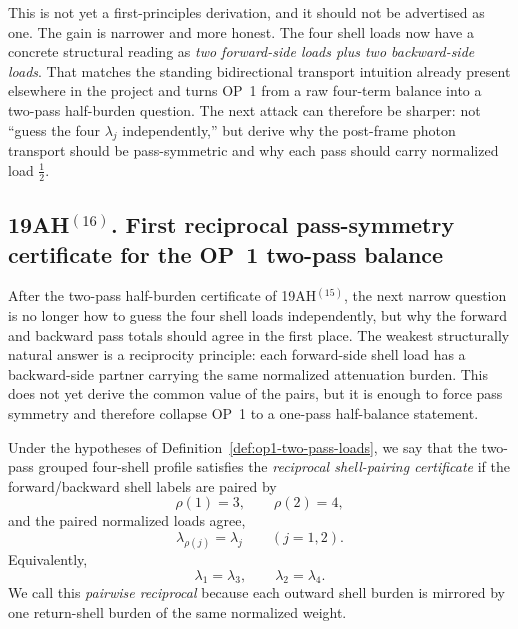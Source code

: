 \begin{remark}
This is not yet a first-principles derivation, and it should not be advertised as one. The gain is narrower and more honest. The four shell loads now have a concrete structural reading as \emph{two forward-side loads plus two backward-side loads}. That matches the standing bidirectional transport intuition already present elsewhere in the project and turns OP~1 from a raw four-term balance into a two-pass half-burden question. The next attack can therefore be sharper: not ``guess the four \(\lambda_j\) independently,'' but derive why the post-frame photon transport should be pass-symmetric and why each pass should carry normalized load \(\tfrac12\).
\end{remark}


\subsection*{19AH$^{(16)}$. First reciprocal pass-symmetry certificate for the OP~1 two-pass balance}
After the two-pass half-burden certificate of 19AH$^{(15)}$, the next narrow question is no longer how to guess the four shell loads independently, but why the forward and backward pass totals should agree in the first place. The weakest structurally natural answer is a reciprocity principle: each forward-side shell load has a backward-side partner carrying the same normalized attenuation burden. This does not yet derive the common value of the pairs, but it is enough to force pass symmetry and therefore collapse OP~1 to a one-pass half-balance statement.

\begin{definition}
\label{def:op1-reciprocal-shell-pairing}
Under the hypotheses of Definition~\ref{def:op1-two-pass-loads}, we say that the two-pass grouped four-shell profile satisfies the \emph{reciprocal shell-pairing certificate} if the forward/backward shell labels are paired by
\[
 \rho(1)=3,\qquad \rho(2)=4,
\]
and the paired normalized loads agree,
\[
 \lambda_{\rho(j)}=\lambda_j\qquad (j=1,2).
\]
Equivalently,
\[
 \lambda_1=\lambda_3,
 \qquad
 \lambda_2=\lambda_4.
\]
We call this \emph{pairwise reciprocal} because each outward shell burden is mirrored by one return-shell burden of the same normalized weight.
\end{definition}

